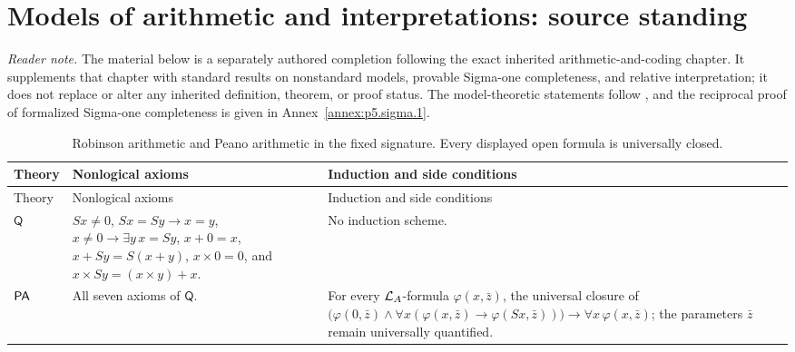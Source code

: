 
\section*{Models of arithmetic and interpretations: source standing}
\noindent\textit{Reader note.}  The material below is a separately authored
completion following the exact inherited arithmetic-and-coding chapter.  It
supplements that chapter with standard results on nonstandard models,
provable Sigma-one completeness, and relative interpretation; it does not
replace or alter any inherited definition, theorem, or proof status.  The
model-theoretic statements follow \cite{Kaye1991,Tennenbaum1959,Skolem1934},
and the reciprocal proof of formalized Sigma-one completeness is given in
Annex~\ref{annex:p5.sigma.1}.

\begingroup\small
\begin{longtable}{@{}p{}p{}p{}@{}}
\caption{Robinson arithmetic and Peano arithmetic in the fixed signature.
Every displayed open formula is universally closed.}
\label{tab:p05-q-pa-axioms}\\
\toprule
Theory & Nonlogical axioms & Induction and side conditions \\
\midrule
\endfirsthead
\toprule
Theory & Nonlogical axioms & Induction and side conditions \\
\midrule
\endhead
\(\mathsf Q\) &
\(Sx\ne0\), \(Sx=Sy\to x=y\),
\(x\ne0\to\exists y\,x=Sy\),
\(x+0=x\), \(x+Sy=S(x+y)\),
\(x\times0=0\), and
\(x\times Sy=(x\times y)+x\). &
No induction scheme. \\
\addlinespace
\(\mathsf{PA}\) & All seven axioms of \(\mathsf Q\). &
For every \(\mathcal{L}_A\)-formula \(\varphi(x,\bar z)\), the universal closure
of
\(\bigl(\varphi(0,\bar z)\land
\forall x(\varphi(x,\bar z)\to\varphi(Sx,\bar z))\bigr)
\to\forall x\,\varphi(x,\bar z)\); the parameters \(\bar z\) remain
universally quantified. \\
\bottomrule
\end{longtable}
\endgroup


